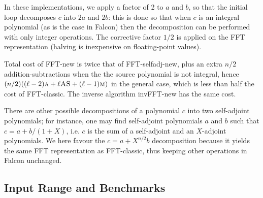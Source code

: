 \documentclass{llncs}
\newcommand{\bR}{\mathbb{R}}
\begin{document}
\begin{algorithm}
    \caption{\ \ \textsf{invFFT-new}\label{alg:ifft-new}}
    \begin{algorithmic}[1]
        \Ensure{$c\in\bR[X]/\Phi_n$ such that $n = 2^\ell \geq 4$}
        \EndFor
        \EndFor
    \end{algorithmic}
\end{algorithm}

In these implementations, we apply a factor of 2 to $a$
and $b$, so that the initial loop decomposes $c$ into $2a$ and $2b$:
this is done so that when $c$ is an integral polynomial (as is the
case in Falcon) then the decomposition can be performed with only
integer operations. The corrective factor $1/2$ is applied on the
FFT representation (halving is inexpensive on floating-point values).

Total cost of \textsf{FFT-new} is twice that of \textsf{FFT-selfadj-new},
plus an extra $n/2$ addition-subtractions when the the source polynomial
is not integral, hence $(n/2)((\ell - 2)\text{\textsc{a}}
+ \ell\text{\textsc{AS}} + (\ell - 1)\text{\textsc{m}})$ in the general
case, which is less than half the cost of \textsf{FFT-classic}. The
inverse algorithm \textsf{invFFT-new} has the same cost.

\begin{remark}
There are other possible decompositions of a polynomial $c$ into two
self-adjoint polynomials; for instance, one may find self-adjoint
polynomials $a$ and $b$ such that $c = a + b/(1 + X)$, i.e. $c$ is the
sum of a self-adjoint and an $X$-adjoint polynomials. We here favour the
$c = a + X^{n/2} b$ decomposition because it yields the same FFT
representation as \textsf{FFT-classic}, thus keeping other operations in
Falcon unchanged.
\end{remark}

\subsection{Input Range and Benchmarks}\label{sec:fft-new-range}
\end{document}
